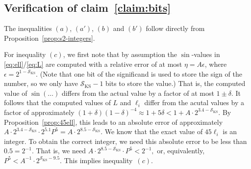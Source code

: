 \documentclass{article}
\newcommand{\macheps}{\epsilon} %
\newcommand{\sigKS}{\mathcal S_{\text{KS}}}
\begin{document}
\subsection*{Verification of claim~\ref{claim:bits}}
The inequalities \((a)\), \((a')\), \((b)\) and \((b')\) follow directly from Proposition~\ref{prop:s2-integers}.  

For inequality \((c)\), we first note that by assumption the \(\sin\)-values in \eqref{eq:ell}\slash\eqref{eq:L} are computed with a relative error of at most \(\eta = A\macheps\), where \(\macheps=2^{1-\sigKS}\).  (Note that one bit of the significand is used to store the sign of the number, so we only have \(\sigKS-1\) bits to store the value.) That is, the computed value of \(\sin(\dots)\) differs from the actual value by a factor of at most \(1\pm \delta\).  It follows that the computed values of \(L\) and \(\ell_i\) differ from the acutal values by a factor of approximately \((1+\delta)(1-\delta)^{-4} \approx 1 + 5\delta < 1+A·2^{3.4-\sigKS}\).  By Proposition~\ref{prop:45ell}, this leads to an absolute error of approximately \(A·2^{3.4-\sigKS}·2^{5.1}P^5 = A·2^{8.5-\sigKS}\).  We know that the exact value of \(45\ell_i\) is an integer.  To obtain the correct integer, we need this absolute error to be less than \(0.5 = 2^{-1}\).  That is, we need
  \(
    A·2^{8.5-\sigKS}·P^5 < 2^{-1},
  \)
  or, equivalently,
  \(
    P^5 < A^{-1}·2^{\sigKS-9.5}.
  \)
  This implies inequality~\((c)\).
\end{document}
